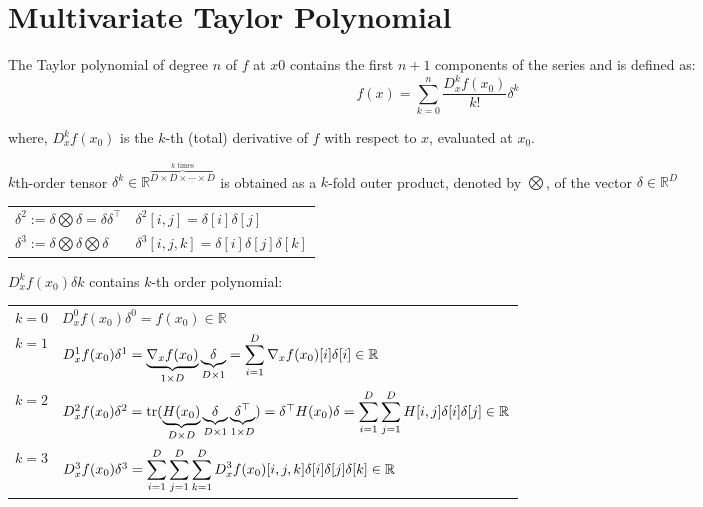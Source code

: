 \section{Multivariate Taylor Polynomial}\label{Multivariate Taylor Polynomial}
The Taylor polynomial of degree $n$ of $f$ at $x0$ contains the first $n + 1$ components of the series and is defined as:
\[
    f(x) = \sum_{k=0}^{n} \displaystyle\dfrac{D_x^k f(x_0)}{k!}\delta^k
\]

where, $D_x^kf(x_0)$ is the $k$-th (total) derivative of $f$ with respect to $x$, evaluated at $x_0$.

$k$th-order tensor \( \delta^k \in \mathbb{R}^{\overset{k \text{ times}}{\overbrace{D \times D \times \cdots \times D}}} \) is obtained as a $k$-fold outer product, denoted by $\bigotimes$, of the vector $\delta \in \mathbb{R}^D$

\begin{table}[H]
    \centering
    \begin{tabular}{l l}
        \( \delta^2 := \delta\bigotimes\delta = \delta\delta^\top \) & \( \delta^2[i, j] = \delta [i]\delta [j] \) \\
        \( \delta^3 := \delta\bigotimes\delta\bigotimes\delta \) & \( \delta^3[i, j, k] = \delta [i]\delta [j]\delta [k] \) \\
    \end{tabular}
\end{table}

$D_x^kf(x_0)\delta k$ contains $k$-th order polynomial:
\begin{table}[H]
    \begin{tabular}{l l}
        $k = 0$ & $D_x^0f(x_0)\delta^0 = f(x_0) \in \mathbb{R}$ \\
         
        $k = 1$ & \( D_x^1f(x_0)\delta^1 = \underbrace{\nabla_xf(x_0)}_{1\times D} \underbrace{\delta}_{D \times 1} = \displaystyle\sum_{i=1}^{D} \nabla_xf(x_0)[i]\delta [i] \in \mathbb{R} \) \\

        $k = 2$ & \( D_x^2f(x_0)\delta^2 = \operatorname{tr}(\underbrace{H(x_0)}_{D\times D} \underbrace{\delta}_{D \times 1} \underbrace{\delta^\top}_{1 \times D}) = \delta^\top H(x_0)\delta = \displaystyle\sum_{i=1}^{D}\displaystyle\sum_{j=1}^{D} H[i,j]\delta [i]\delta [j] \in \mathbb{R} \) \\

        $k = 3$ & \( D_x^3f(x_0)\delta^3 = \displaystyle\sum_{i=1}^{D} \displaystyle\sum_{j=1}^{D} \displaystyle\sum_{k=1}^{D} D_x^3f(x_0)[i,j,k]\delta [i] \delta [j] \delta [k] \in \mathbb{R} \) \\
         
    \end{tabular}
\end{table}

